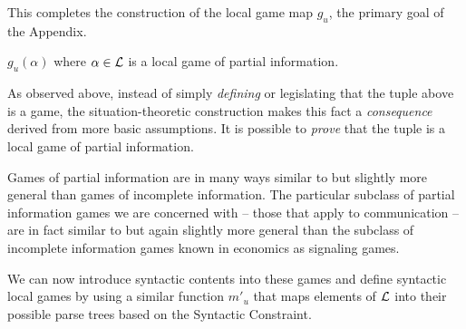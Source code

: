 \noindent This completes the construction of the local game map $g_u$, the primary goal of the Appendix. 




\begin{theorem} {$g_u(\alpha)$ where $\alpha \in {\cal L}$ is a local game of partial information.}\end{theorem}

\noindent As observed above, instead of simply \emph{defining} or legislating that the tuple above is a game, the situation-theoretic construction makes this fact a \emph{consequence} derived from more basic assumptions. It is possible to \emph{prove} that the tuple is a local game of partial information.

Games of partial information are in many ways similar to but slightly more general than games of incomplete information. The particular subclass of partial information games we are concerned with -- those that apply to communication -- are in fact similar to but again slightly more general than the subclass of incomplete information games known in economics as signaling games.

We can now introduce syntactic contents into these games and define syntactic local games by using a similar function $m'_u$ that maps elements of $\cal L$ into their possible parse trees based on the Syntactic Constraint.

